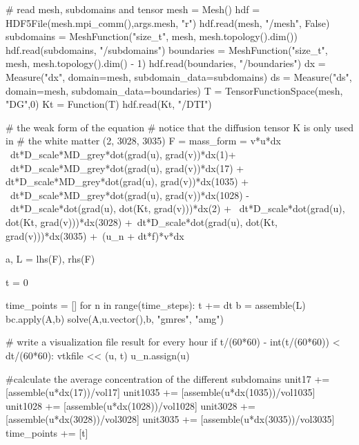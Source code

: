 \begin{python}

# read mesh, subdomains and tensor  
mesh = Mesh()
hdf = HDF5File(mesh.mpi_comm(),args.mesh, "r")
hdf.read(mesh, "/mesh", False)  
subdomains = MeshFunction("size_t", mesh, mesh.topology().dim())
hdf.read(subdomains, "/subdomains")
boundaries  = MeshFunction("size_t", mesh, mesh.topology().dim() - 1)
hdf.read(boundaries, "/boundaries")
dx = Measure("dx", domain=mesh, subdomain_data=subdomains)
ds = Measure("ds", domain=mesh, subdomain_data=boundaries)
T = TensorFunctionSpace(mesh, "DG",0)
Kt = Function(T) 
hdf.read(Kt, "/DTI")


# the weak form of the equation  
# notice that the diffusion tensor K is only used in 
# the white matter (2, 3028, 3035)   	
F = mass_form = v*u*dx \
    dt*D_scale*MD_grey*dot(grad(u), grad(v))*dx(1)+ \  
    dt*D_scale*MD_grey*dot(grad(u), grad(v))*dx(17) +  
    dt*D_scale*MD_grey*dot(grad(u), grad(v))*dx(1035) + \ 
    dt*D_scale*MD_grey*dot(grad(u), grad(v))*dx(1028) - \
    dt*D_scale*dot(grad(u), dot(Kt, grad(v)))*dx(2)  + \
    dt*D_scale*dot(grad(u), dot(Kt, grad(v)))*dx(3028) +\ 
    dt*D_scale*dot(grad(u), dot(Kt, grad(v)))*dx(3035) +\ 
    (u_n + dt*f)*v*dx

a, L = lhs(F), rhs(F)

t = 0

time_points = []
for n in range(time_steps):
    t += dt
    b = assemble(L)
    bc.apply(A,b)
    solve(A,u.vector(),b, "gmres", "amg")

    # write a visualization file result for every hour 
    if t/(60*60) - int(t/(60*60)) < dt/(60*60):  vtkfile << (u, t)
    u_n.assign(u)

    #calculate the average concentration of the different subdomains
    unit17 += [assemble(u*dx(17))/vol17]
    unit1035 += [assemble(u*dx(1035))/vol1035]
    unit1028 += [assemble(u*dx(1028))/vol1028]
    unit3028 += [assemble(u*dx(3028))/vol3028]
    unit3035 += [assemble(u*dx(3035))/vol3035]
    time_points += [t] 
\end{python}

